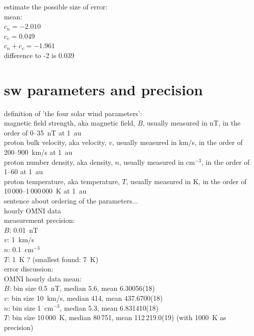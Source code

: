 estimate the possible size of error:\\
mean:\\
$c_n = -2.010$\\
$c_v = 0.049$\\
$c_n + c_v = -1.961$\\
difference to -2 is 0.039\\

\section{sw parameters and precision}
definition of 'the four solar wind parameters':\\	%
	magnetic field strength, aka magnetic field, $B$, usually measured in nT, in the order of 0--35~nT at 1~au\\
	proton bulk velocity, aka velocity, $v$, usually measured in km/s, in the order of 200--900~km/s at 1~au\\
	proton number density, aka density, $n$, usually measured in cm$^{-3}$, in the order of 1--60 at 1~au\\
	proton temperature, aka temperature, $T$, usually measured in K, in the order of 10\,000--1\,000\,000~K at 1~au\\
sentence about ordering of the parameters...\\

hourly OMNI data\\
measurement precision:\\
$B$: 0.01~nT\\
$v$: 1~km/s\\
$n$: 0.1~cm$^{-3}$\\
$T$: 1~K ? (smallest found: 7~K)\\

error discussion:\\
OMNI hourly data mean:\\
$B$: bin size 0.5~nT, median 5.6, mean 6.30056(18)\\
$v$: bin size 10~km/s, median 414, mean 437.6700(18)\\
$n$: bin size 1~cm$^{-3}$, median 5.3, mean 6.831410(18)\\
$T$: bin size 10\,000~K, median 80\,751, mean 112\,219.0(19) (with 1000~K as precision)\\

